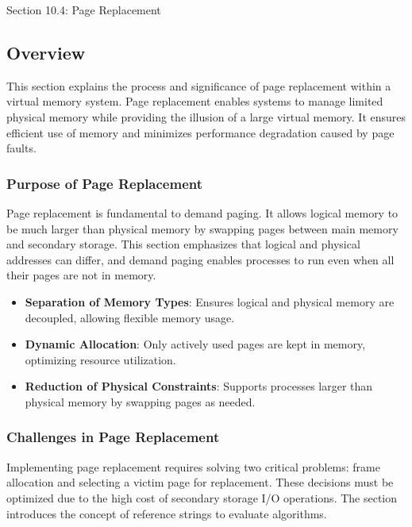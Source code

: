 \begin{notes}{Section 10.4: Page Replacement}
    \subsection*{Overview}

    This section explains the process and significance of page replacement within a virtual memory system. Page replacement enables systems to manage limited physical memory while providing the illusion 
    of a large virtual memory. It ensures efficient use of memory and minimizes performance degradation caused by page faults.
    
    \subsubsection*{Purpose of Page Replacement}
    
    Page replacement is fundamental to demand paging. It allows logical memory to be much larger than physical memory by swapping pages between main memory and secondary storage. This section emphasizes 
    that logical and physical addresses can differ, and demand paging enables processes to run even when all their pages are not in memory.
    
    \begin{highlight}
        \begin{itemize}
            \item \textbf{Separation of Memory Types}: Ensures logical and physical memory are decoupled, allowing flexible memory usage.
            \item \textbf{Dynamic Allocation}: Only actively used pages are kept in memory, optimizing resource utilization.
            \item \textbf{Reduction of Physical Constraints}: Supports processes larger than physical memory by swapping pages as needed.
        \end{itemize}
    \end{highlight}
    
    \subsubsection*{Challenges in Page Replacement}
    
    Implementing page replacement requires solving two critical problems: frame allocation and selecting a victim page for replacement. These decisions must be optimized due to the high cost of secondary 
    storage I/O operations. The section introduces the concept of reference strings to evaluate algorithms.
    

\end{notes}

